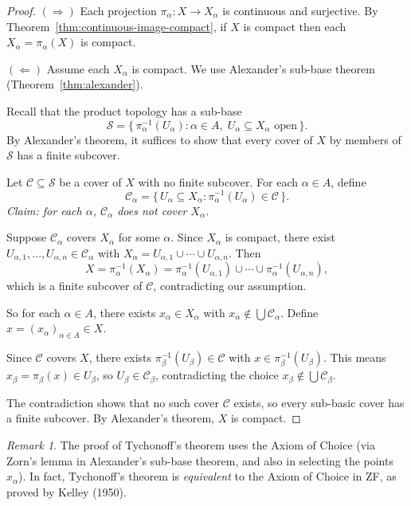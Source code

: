 \documentclass[11pt,a4paper,twoside]{book}
\theoremstyle{remark}
\newtheorem{remark}[theorem]{Remark}
\theoremstyle{definition}
\theoremstyle{definition}
\begin{document}
\begin{proof}
$(\Rightarrow)$ Each projection $\pi_\alpha \colon X \to X_\alpha$ is
continuous and surjective.  By Theorem~\ref{thm:continuous-image-compact}, if
$X$ is compact then each $X_\alpha = \pi_\alpha(X)$ is compact.

$(\Leftarrow)$ Assume each $X_\alpha$ is compact.  We use Alexander's sub-base
theorem (Theorem~\ref{thm:alexander}).

Recall that the product topology has a sub-base
\[
  \mathcal{S} = \bigl\{\, \pi_\alpha^{-1}(U_\alpha) :
    \alpha \in A,\; U_\alpha \subseteq X_\alpha \text{ open} \,\bigr\}.
\]
By Alexander's theorem, it suffices to show that every cover of $X$ by members
of $\mathcal{S}$ has a finite subcover.

Let $\mathcal{C} \subseteq \mathcal{S}$ be a cover of $X$ with no finite
subcover.  For each $\alpha \in A$, define
\[
  \mathcal{C}_\alpha = \bigl\{\, U_\alpha \subseteq X_\alpha :
    \pi_\alpha^{-1}(U_\alpha) \in \mathcal{C} \,\bigr\}.
\]
\emph{Claim: for each $\alpha$, $\mathcal{C}_\alpha$ does not cover
$X_\alpha$.}

Suppose $\mathcal{C}_\alpha$ covers $X_\alpha$ for some $\alpha$.  Since
$X_\alpha$ is compact, there exist $U_{\alpha,1}, \ldots, U_{\alpha,n}
\in \mathcal{C}_\alpha$ with
$X_\alpha = U_{\alpha,1} \cup \cdots \cup U_{\alpha,n}$.  Then
\[
  X = \pi_\alpha^{-1}(X_\alpha) = \pi_\alpha^{-1}(U_{\alpha,1})
  \cup \cdots \cup \pi_\alpha^{-1}(U_{\alpha,n}),
\]
which is a finite subcover of $\mathcal{C}$, contradicting our assumption.

So for each $\alpha \in A$, there exists $x_\alpha \in X_\alpha$ with
$x_\alpha \notin \bigcup \mathcal{C}_\alpha$.  Define $x = (x_\alpha)_{\alpha
\in A} \in X$.

Since $\mathcal{C}$ covers $X$, there exists $\pi_\beta^{-1}(U_\beta) \in
\mathcal{C}$ with $x \in \pi_\beta^{-1}(U_\beta)$.  This means
$x_\beta = \pi_\beta(x) \in U_\beta$, so $U_\beta \in \mathcal{C}_\beta$,
contradicting the choice $x_\beta \notin \bigcup \mathcal{C}_\beta$.

The contradiction shows that no such cover $\mathcal{C}$ exists, so every
sub-basic cover has a finite subcover.  By Alexander's theorem, $X$ is compact.
\end{proof}

\begin{remark}\label{rem:tychonoff-ac}
The proof of Tychonoff's theorem uses the Axiom of Choice (via Zorn's lemma
in Alexander's sub-base theorem, and also in selecting the points
$x_\alpha$).  In fact, Tychonoff's theorem is \emph{equivalent} to the Axiom
of Choice in ZF, as proved by Kelley (1950).
\end{remark}
\end{document}
